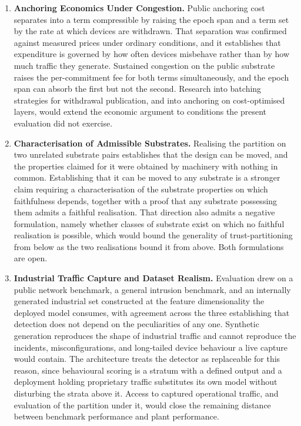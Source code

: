 \begin{enumerate}
\item \textbf{Anchoring Economics Under Congestion.} Public anchoring cost separates into a term compressible by raising the epoch span and a term set by the rate at which devices are withdrawn. That separation was confirmed against measured prices under ordinary conditions, and it establishes that expenditure is governed by how often devices misbehave rather than by how much traffic they generate. Sustained congestion on the public substrate raises the per-commitment fee for both terms simultaneously, and the epoch span can absorb the first but not the second. Research into batching strategies for withdrawal publication, and into anchoring on cost-optimised layers, would extend the economic argument to conditions the present evaluation did not exercise.

\item \textbf{Characterisation of Admissible Substrates.} Realising the partition on two unrelated substrate pairs establishes that the design can be moved, and the properties claimed for it were obtained by machinery with nothing in common. Establishing that it can be moved to any substrate is a stronger claim requiring a characterisation of the substrate properties on which faithfulness depends, together with a proof that any substrate possessing them admits a faithful realisation. That direction also admits a negative formulation, namely whether classes of substrate exist on which no faithful realisation is possible, which would bound the generality of trust-partitioning from below as the two realisations bound it from above. Both formulations are open.

\item \textbf{Industrial Traffic Capture and Dataset Realism.} Evaluation drew on a public network benchmark, a general intrusion benchmark, and an internally generated industrial set constructed at the feature dimensionality the deployed model consumes, with agreement across the three establishing that detection does not depend on the peculiarities of any one. Synthetic generation reproduces the shape of industrial traffic and cannot reproduce the incidents, misconfigurations, and long-tailed device behaviour a live capture would contain. The architecture treats the detector as replaceable for this reason, since behavioural scoring is a stratum with a defined output and a deployment holding proprietary traffic substitutes its own model without disturbing the strata above it. Access to captured operational traffic, and evaluation of the partition under it, would close the remaining distance between benchmark performance and plant performance.


\end{enumerate}
